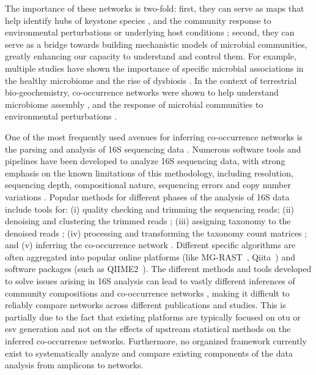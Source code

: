  The importance of these networks is two-fold: first, they can serve as maps that help identify hubs of keystone species \cite{Menon2018,Rottjers2018}, and the community response to environmental perturbations or underlying host conditions \cite{Gilbert2016}; second, they can serve as a bridge towards building mechanistic models of microbial communities, greatly enhancing our capacity to understand and control them.
 For example, multiple studies have shown the importance of specific microbial  associations in the healthy microbiome \cite{Lloyd-Price2016} and the rise of dysbiosis \cite{Wang2017,Gilbert2016,Belizario2015}.
 In the context of terrestrial bio-geochemistry, co-occurrence networks were shown to help understand microbiome assembly \cite{Fierer2017}, and  the response of microbial communities to environmental perturbations \cite{Jiao2019}.

One of the most frequently used avenues for inferring co-occurrence networks is the parsing and analysis of 16S sequencing data \cite{Rottjers2018,Friedman2012}.
Numerous software tools and pipelines have been developed to analyze 16S sequencing data, with strong emphasis on the known limitations of this methodology, including resolution, sequencing depth, compositional nature, sequencing errors and copy number variations \cite{Bharti2019,Pollock2018}.
Popular methods for different phases of the analysis of 16S data include tools for: (i) quality checking and trimming the sequencing reads; (ii) denoising and clustering the trimmed reads \cite{Caporaso2010,Callahan2016}; (iii) assigning taxonomy to the denoised reads \cite{DeSantis2006,Quast2012}; (iv) processing and transforming the taxonomy count matrices \cite{Weiss2015}; and (v) inferring the co-occurrence network \cite{Cougoul2019,Kurtz2015}.
Different specific algorithms are often aggregated into popular online platforms (like MG-RAST~\cite{Keegan2016}, Qiita~\cite{qiita}) and software packages (such as QIIME2~\cite{bolyenReproducibleInteractiveScalable2019}).
The different methods and tools developed to solve issues arising in 16S analysis can lead to vastly different inferences of community compositions and co-occurrence networks \cite{Golob2017,Weiss2016}, making it difficult to reliably compare networks across different publications and studies.
 This is partially due to the fact that existing platforms are typically focused on \ac{otu} or \ac{esv} generation and not on the effects of upstream statistical methods on the inferred co-occurrence networks.
 Furthermore, no organized framework currently exist to systematically analyze and compare existing components of the data analysis from amplicons to networks.

